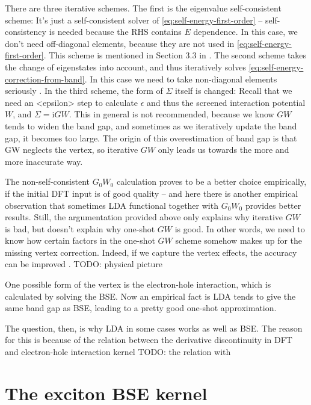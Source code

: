 \documentclass[hyperref, a4paper, 12pt]{report}
\newcommand*{\ii}{\mathrm{i}}
\def\texttt#1{<#1>}%
\newcommand{\shortcode}[1]{\texttt{#1}}
\begin{document}
There are three iterative schemes.
The first is the eigenvalue self-consistent scheme:
It's just a self-consistent solver of \eqref{eq:self-energy-first-order}
-- self-consistency is needed 
because the RHS contains $E$ dependence.
In this case, we don't need off-diagonal elements,
because they are not used in \eqref{eq:self-energy-first-order}.
This scheme is mentioned in Section 3.3 in \cite{berkeleygw}.
The second scheme takes the change of eigenstates into account,
and thus iteratively solves \eqref{eq:self-energy-correction-from-band}.
In this case we need to take non-diagonal elements seriously \cite{faleev2004all,aguilera2013g}.
In the third scheme, the form of $\Sigma$ itself is changed:
Recall that we need an \shortcode{epsilon} step to calculate $\epsilon$ 
and thus the screened interaction potential $W$, 
and $\Sigma = \ii G W$. 
This in general is not recommended,
because we know $GW$ tends to widen the band gap,
and sometimes as we iteratively update the band gap,
it becomes too large.
The origin of this overestimation of band gap is 
that GW neglects the vertex,
so iterative $GW$ only leads us towards the more and more inaccurate way. 

The non-self-consistent $G_0 W_0$ calculation proves to be a better choice empirically,
if the initial DFT input is of good quality -- 
and here there is another empirical observation that 
sometimes LDA functional together with $G_0 W_0$ provides better results.
Still, the argumentation provided above only explains why iterative $GW$ is bad, 
but doesn't explain why one-shot $GW$ is good. 
In other words, we need to know how certain factors 
in the one-shot $GW$ scheme somehow makes up for 
the missing vertex correction.
Indeed, if we capture the vertex effects, 
the accuracy can be improved 
\cite{PhysRevLett.99.246403}.
TODO: physical picture

One possible form of the vertex is the electron-hole interaction, which is calculated by solving the BSE. 
Now an empirical fact is  
LDA tends to give the same band gap as BSE, 
leading to a pretty good one-shot approximation. 

The question, then, is why LDA in some cases works as well as BSE.
The reason for this is because of the relation between the derivative discontinuity in DFT and electron-hole interaction kernel
TODO: the relation with \cite{perdew1982density}

\section{The exciton BSE kernel} 
\end{document}
